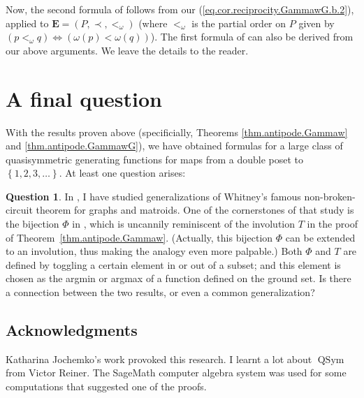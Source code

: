 \documentclass[12pt]{article}
\theoremstyle{plain}
\theoremstyle{definition}
\newtheorem{question}[theorem]{Question}
\theoremstyle{remark}
\newcommand{\QSym}{{\operatorname{QSym}}}
\newcommand{\EE}{{\mathbf{E}}}
\begin{document}
Now, the second formula of \cite[Theorem 2.13]{Joch} follows from our
(\ref{eq.cor.reciprocity.GammawG.b.2}), applied to $\EE = \left(
P,\prec,<_{\omega}\right)  $ (where $<_{\omega}$ is the partial order on $P$
given by $\left(  p<_{\omega}q\right)  \Longleftrightarrow\left(
\omega\left(  p\right)  <\omega\left(  q\right)  \right)  $). The first
formula of \cite[Theorem 2.13]{Joch} can also be derived from our above
arguments. We leave the details to the reader.

\section{A final question}

With the results proven above (specificially, Theorems
\ref{thm.antipode.Gammaw} and \ref{thm.antipode.GammawG}), we have obtained
formulas for a large class of quasisymmetric generating functions for maps
from a double poset to $\left\{  1,2,3,\ldots\right\}  $. At least one
question arises:

\begin{question}
In \cite{Gri-nbc}, I have studied generalizations of Whitney's famous
non-broken-circuit theorem for graphs and matroids. One of the cornerstones of
that study is the bijection $\Phi$ in \cite[proofs of Lemma 2.7 and Lemma
5.25]{Gri-nbc}, which is uncannily reminiscent of the involution $T$ in the proof
of Theorem~\ref{thm.antipode.Gammaw}. (Actually, this bijection $\Phi$ can be
extended to an involution, thus making the analogy even more palpable.) Both
$\Phi$ and $T$ are defined by toggling a certain element in or out of a
subset; and this element is chosen as the argmin or argmax of a function
defined on the ground set. Is there a connection between the two results, or
even a common generalization?
\end{question}

\subsection*{Acknowledgments}
Katharina Jochemko's work \cite{Joch} provoked this research.
I learnt a lot about $\QSym$ from Victor Reiner. The SageMath
computer algebra system \cite{SageMath} was used for some
computations that suggested one of the proofs.
\end{document}
